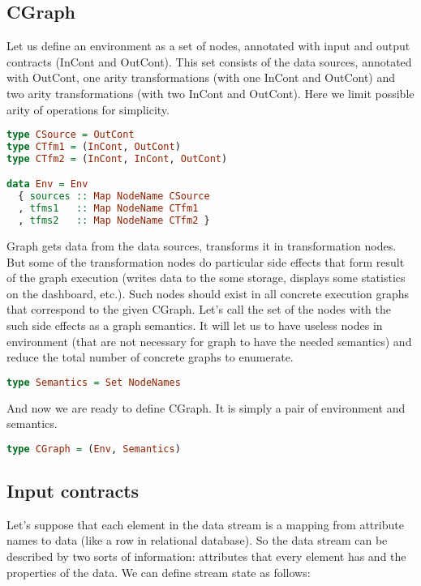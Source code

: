 \subsection{CGraph}

Let us define an environment as a set of nodes, annotated with input and output contracts (InCont and OutCont).
This set consists of the data sources, annotated with OutCont, one arity transformations (with one InCont and OutCont) and two arity transformations (with two InCont and OutCont).
Here we limit possible arity of operations for simplicity.

\begin{lstlisting}[language=Haskell]
type CSource = OutCont
type CTfm1 = (InCont, OutCont)
type CTfm2 = (InCont, InCont, OutCont)

data Env = Env
  { sources :: Map NodeName CSource
  , tfms1   :: Map NodeName CTfm1
  , tfms2   :: Map NodeName CTfm2 }
\end{lstlisting}

Graph gets data from the data sources, transforms it in transformation nodes.
But some of the transformation nodes do particular side effects that form result of the graph execution (writes data to the some storage, displays some statistics on the dashboard, etc.).
Such nodes should exist in all concrete execution graphs that correspond to the given CGraph.
Let's call the set of the nodes with the such side effects as a graph semantics.
It will let us to have useless nodes in environment (that are not necessary for graph to have the needed semantics) and reduce the total number of concrete graphs to enumerate.

\begin{lstlisting}[language=Haskell]
type Semantics = Set NodeNames
\end{lstlisting}

And now we are ready to define CGraph.
It is simply a pair of environment and semantics.

\begin{lstlisting}[language=Haskell]
type CGraph = (Env, Semantics)
\end{lstlisting}

\subsection{Input contracts}

Let's suppose that each element in the data stream is a mapping from attribute names to data (like a row in relational database).
So the data stream can be described by two sorts of information: attributes that every element has and the properties of the data.
We can define stream state as follows:

